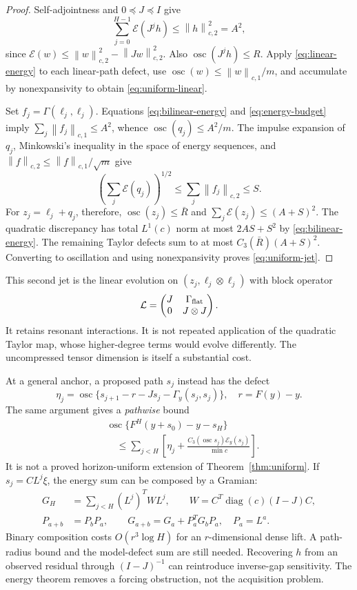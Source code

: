 \documentclass[journal]{IEEEtran}
\theoremstyle{definition}
\newcommand{\norm}[1]{\left\lVert#1\right\rVert}
\DeclareMathOperator{\diag}{diag}
\DeclareMathOperator{\osc}{osc}
\begin{document}
\begin{proof}
Self-adjointness and $0\preceq J\preceq I$ give
\begin{equation}
 \sum_{j=0}^{H-1}\mathcal E(J^jh)
 \leq\norm h_{c,2}^2=A^2,\label{eq:energy-budget}
\end{equation}
since $\mathcal E(w)\leq\norm w_{c,2}^2-\norm{Jw}_{c,2}^2$.
Also $\osc(J^jh)\leq R$. Apply \eqref{eq:linear-energy} to each
linear-path defect, use $\osc(w)\leq\norm w_{c,1}/m$, and accumulate by
nonexpansivity to obtain \eqref{eq:uniform-linear}.

Set $f_j=\Gamma(\ell_j,\ell_j)$. Equations
\eqref{eq:bilinear-energy} and \eqref{eq:energy-budget} imply
$\sum_j\norm{f_j}_{c,1}\leq A^2$, whence
$\osc(q_j)\leq A^2/m$. The impulse expansion of $q_j$, Minkowski's
inequality in the space of energy sequences, and
$\norm f_{c,2}\leq\norm f_{c,1}/\sqrt m$ give
\[
 \left(\sum_j\mathcal E(q_j)\right)^{1/2}
 \leq\sum_j\norm{f_j}_{c,2}\leq S.
\]
For $z_j=\ell_j+q_j$, therefore,
$\osc(z_j)\leq\bar R$ and
$\sum_j\mathcal E(z_j)\leq(A+S)^2$.
The quadratic discrepancy has total $L^1(c)$ norm at most
$2AS+S^2$ by \eqref{eq:bilinear-energy}. The remaining Taylor defects
sum to at most $C_3(\bar R)(A+S)^2$. Converting to oscillation and
using nonexpansivity proves \eqref{eq:uniform-jet}.
\end{proof}
This second jet is the linear evolution on
$(z_j,\ell_j\otimes\ell_j)$ with block operator
\[
 \mathcal L=\begin{pmatrix}J&\Gamma_{\rm flat}\\0&J\otimes J\end{pmatrix}.
\]
It retains resonant interactions. It is not repeated application of the
quadratic Taylor map, whose higher-degree terms would evolve differently.
The uncompressed tensor dimension is itself a substantial cost.

At a general anchor, a proposed path $s_j$ instead has the defect
\[
 \eta_j=\osc\{s_{j+1}-r-Js_j-\Gamma_y(s_j,s_j)\},\quad r=F(y)-y.
\]
The same argument gives a \emph{pathwise} bound
\begin{align}
 &\osc\{F^H(y+s_0)-y-s_H\}\nonumber\\
 &\quad\leq\sum_{j<H}\left[
 \eta_j+\frac{C_3(\osc s_j)\mathcal E_y(s_j)}{\min c}\right].
 \label{eq:moving-path}
\end{align}
It is not a proved horizon-uniform extension of Theorem~\ref{thm:uniform}.
If $s_j=C L^j\xi$, the energy sum can be composed by a Gramian:
\begin{align*}
 G_H&=\sum_{j<H}(L^j)^TW L^j,\qquad
 W=C^T\diag(c)(I-J)C,\\
 P_{a+b}&=P_bP_a,\qquad G_{a+b}=G_a+P_a^TG_bP_a,
 \quad P_a=L^a.
\end{align*}
Binary composition costs $O(r^3\log H)$ for an $r$-dimensional dense lift.
A path-radius bound and the model-defect sum are still needed. Recovering
$h$ from an observed residual through $(I-J)^{-1}$ can reintroduce inverse-gap
sensitivity. The energy theorem removes a forcing obstruction, not the
acquisition problem.
\end{document}
